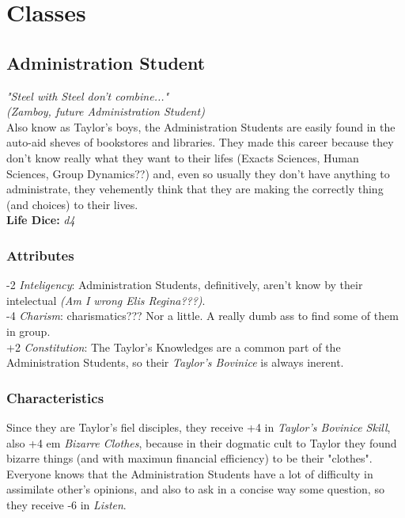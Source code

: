 \documentclass[ letterpaper,12pt]{article}
\begin{document}
\section{Classes}

\subsection{Administration Student}
{\it "Steel with Steel don't combine..."\\(Zamboy, future Administration Student)}\\

Also know as Taylor's boys, the Administration Students are easily found in the auto-aid sheves of bookstores and libraries. They made this career because they don't know really what they want to their lifes (Exacts Sciences, Human Sciences, Group Dynamics??) and, even so usually they don't have anything to administrate, they vehemently think that they are making the correctly thing (and choices) to their lives.\\ 

{\bf Life Dice:} {\it d4}

\subsubsection{Attributes}
-2 {\it Inteligency}: Administration Students, definitively,  aren't know by their intelectual {\it (Am I wrong Elis Regina???)}.\\
-4 {\it Charism}: charismatics??? Nor a little. A really dumb ass to find some of them in group.\\
+2 {\it Constitution}: The Taylor's Knowledges are a common part of the Administration Students, so their {\it Taylor's Bovinice} is always inerent.


\subsubsection{Characteristics}
Since they are Taylor's fiel disciples, they receive +4 in {\it Taylor's Bovinice Skill}, also +4 em {\it Bizarre Clothes}, because in their dogmatic cult to Taylor they found bizarre things (and with maximun financial efficiency) to be their "clothes". \\

Everyone knows that the Administration Students have a lot of difficulty in assimilate other's opinions, and also to ask in a concise way some question, so they receive -6 in {\it Listen}.
\end{document}
